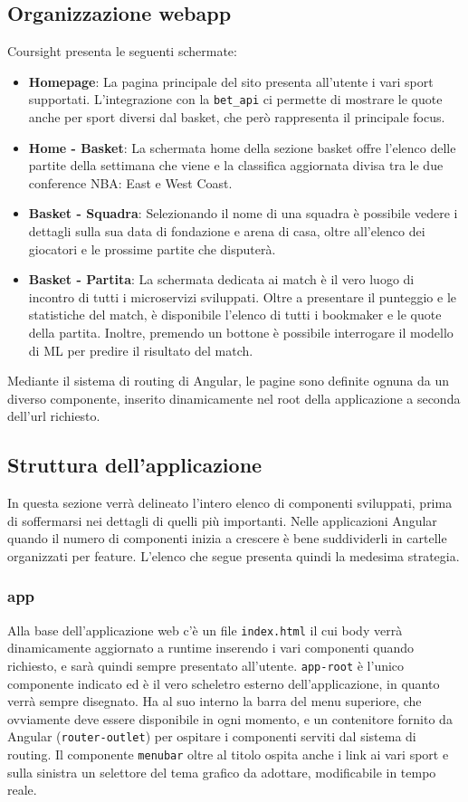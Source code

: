 \subsection{Organizzazione webapp}
Coursight presenta le seguenti schermate:
\begin{itemize}
    \item \textbf{Homepage}: La pagina principale del sito presenta all'utente i vari sport supportati. L'integrazione con la \texttt{bet\_api} ci permette di mostrare le quote anche per sport diversi dal basket, che però rappresenta il principale focus.
    \item \textbf{Home - Basket}: La schermata home della sezione basket offre l'elenco delle partite della settimana che viene e la classifica aggiornata divisa tra le due conference NBA: East e West Coast. 
    \item \textbf{Basket - Squadra}: Selezionando il nome di una squadra è possibile vedere i dettagli sulla sua data di fondazione e arena di casa, oltre all'elenco dei giocatori e le prossime partite che disputerà.
    \item \textbf{Basket - Partita}: La schermata dedicata ai match è il vero luogo di incontro di tutti i microservizi sviluppati. Oltre a presentare il punteggio e le statistiche del match, è disponibile l'elenco di tutti i bookmaker e le quote della partita. Inoltre, premendo un bottone è possibile interrogare il modello di ML per predire il risultato del match.
\end{itemize}
Mediante il sistema di routing di Angular, le pagine sono definite ognuna da un diverso componente, inserito dinamicamente nel root della applicazione a seconda dell'url richiesto. 

\subsection{Struttura dell'applicazione}
In questa sezione verrà delineato l'intero elenco di componenti sviluppati, prima di soffermarsi nei dettagli di quelli più importanti. Nelle applicazioni Angular quando il numero di componenti inizia a crescere è bene suddividerli in cartelle organizzati per feature. L'elenco che segue presenta quindi la medesima strategia.

\subsubsection{app}
Alla base dell'applicazione web c'è un file \texttt{index.html} il cui body verrà dinamicamente aggiornato a runtime inserendo i vari componenti quando richiesto, e sarà quindi sempre presentato all'utente. 
\texttt{app-root} è l'unico componente indicato ed è il vero scheletro esterno dell'applicazione, in quanto verrà sempre disegnato. Ha al suo interno la barra del menu superiore, che ovviamente deve essere disponibile in ogni momento, e un contenitore fornito da Angular (\texttt{router-outlet}) per ospitare i componenti serviti dal sistema di routing. 
Il componente \texttt{menubar} oltre al titolo ospita anche i link ai vari sport e sulla sinistra un selettore del tema grafico da adottare, modificabile in tempo reale. 


